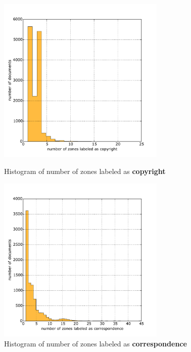 \begin{figure}
\centering
\begin{minipage}[t!]{0.48\linewidth}
  \includegraphics[width=8cm]{plots/copyright_histogram}
  \caption{Histogram of number of zones labeled as \textbf{copyright}}
  \label{fig:copyright_histogram}
\end{minipage}
\quad
\begin{minipage}[t!]{0.48\linewidth}
  \includegraphics[width=8cm]{plots/correspondence_histogram}
  \caption{Histogram of number of zones labeled as \textbf{correspondence}}
  \label{fig:correspondence_histogram}
\end{minipage}
\end{figure}

